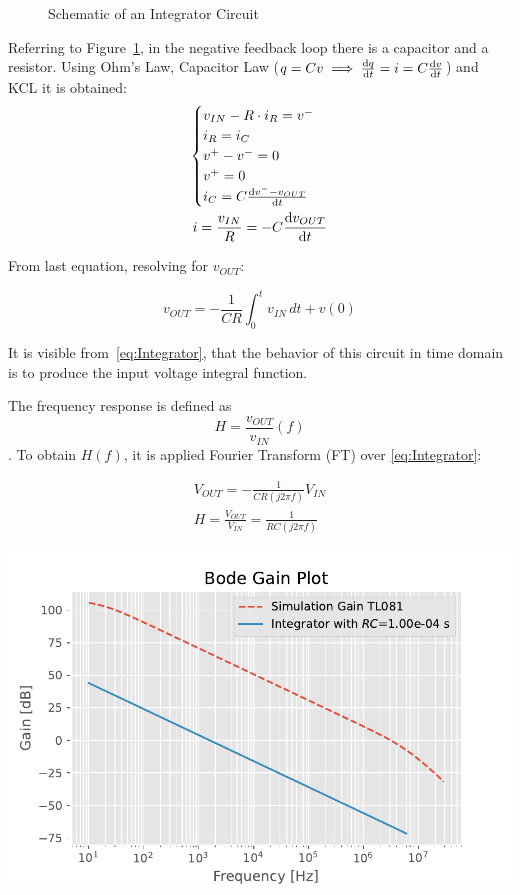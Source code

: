 \documentclass[a4paper, twocolumn]{article}
\begin{document}
\begin{figure}
    \centering
    \def\svgwidht{\columnwidth}
    
    \caption{Schematic of an Integrator Circuit}
    \label{fig:IntegrScheme}
\end{figure}

Referring to Figure~\ref{fig:IntegrScheme}, in the negative feedback loop there is a capacitor and a resistor.
Using Ohm's Law, Capacitor Law ($ q = Cv \implies \dv {q}{t}=i=C\dv{v}{t} $) and KCL it is obtained:
\begin{gather*}
    \begin{cases}
        v_{IN} - R\cdot i_R = v^-\\
        i_R=i_C\\
        v^+-v^-=0\\
        v^+=0\\
        i_C=C\dv{v^--v_{OUT}}{t}
    \end{cases}\\
    i = \frac{v_{IN}}{R}=-C\dv{v_{OUT}}{t}\\
\end{gather*}

From last equation, resolving for $v_{OUT}$:

\begin{equation}
    \label{eq:Integrator}
    v_{OUT}=-\frac{1}{CR}\int_0^t{v_{IN}}\,dt + v(0)
\end{equation}

It is visible from~\eqref{eq:Integrator}, that the behavior of this circuit in time domain is to produce the input voltage integral function.

The frequency response is defined as \[H=\frac{v_{OUT}}{v_{IN}}(f)\].
To obtain $H(f)$, it is applied Fourier Transform (FT) over \eqref{eq:Integrator}:

\begin{gather}
    V_{OUT}=-\frac{1}{CR(j2\pi f)}V_{IN}\\
    H = \frac{V_{OUT}}{V_{IN}} = \frac{1}{RC(j2\pi f)}   
\end{gather}

\begin{center}
    \includegraphics[width=\columnwidth]{def_graph/IntegratorBodeTheo.pdf}
    \label{fig:IntBodeGraphTheo}
\end{center}
\end{document}
